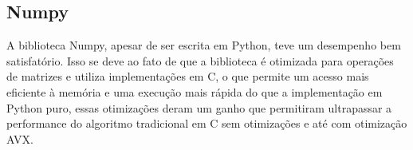 \documentclass[12pt]{article}
\begin{document}
\subsection{Numpy}
A biblioteca Numpy, apesar de ser escrita em Python, teve um desempenho bem satisfatório. Isso se deve ao fato de que a biblioteca é otimizada para operações de matrizes e utiliza implementações em C, o que permite um acesso mais eficiente à memória e uma execução mais rápida do que a implementação em Python puro, essas otimizações deram um ganho que permitiram ultrapassar a performance do algoritmo tradicional em C sem otimizações e até com otimização AVX.
\end{document}
